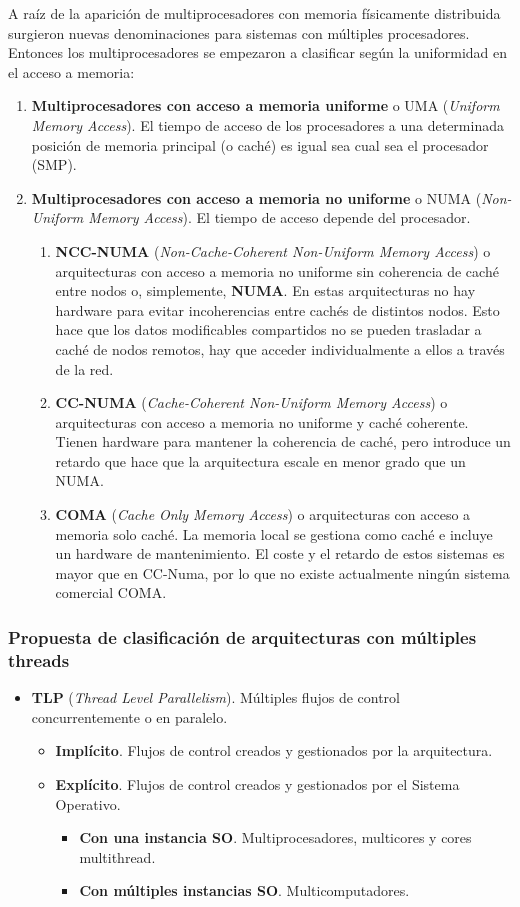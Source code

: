 \documentclass[12pt,spanish]{article}
\begin{document}
A raíz de la aparición de multiprocesadores con memoria físicamente distribuida surgieron nuevas denominaciones para sistemas con múltiples procesadores. Entonces los multiprocesadores se empezaron a clasificar según la uniformidad en el acceso a memoria:
\begin{enumerate}
\item \textbf{Multiprocesadores con acceso a memoria uniforme} o UMA (\textit{Uniform Memory Access}). El tiempo de acceso de los procesadores a una determinada posición de memoria principal (o caché) es igual sea cual sea el procesador (SMP).
\item \textbf{Multiprocesadores con acceso a memoria no uniforme} o NUMA (\textit{Non-Uniform Memory Access}). El tiempo de acceso depende del procesador.
\begin{enumerate}
\item \textbf{NCC-NUMA} (\textit{Non-Cache-Coherent Non-Uniform Memory Access}) o arquitecturas con acceso a memoria no uniforme sin coherencia de caché entre nodos o, simplemente, \textbf{NUMA}. En estas arquitecturas no hay hardware para evitar incoherencias entre cachés de distintos nodos. Esto hace que los datos modificables compartidos no se pueden trasladar a caché de nodos remotos, hay que acceder individualmente a ellos a través de la red.
\item \textbf{CC-NUMA} (\textit{Cache-Coherent Non-Uniform Memory Access}) o arquitecturas con acceso a memoria no uniforme y caché coherente. Tienen hardware para mantener la coherencia de caché, pero introduce un retardo que hace que la arquitectura escale en menor grado que un NUMA.
\item \textbf{COMA} (\textit{Cache Only Memory Access}) o arquitecturas con acceso a memoria solo caché. La memoria local se gestiona como caché e incluye un hardware de mantenimiento. El coste y el retardo de estos sistemas es mayor que en CC-Numa, por lo que no existe actualmente ningún sistema comercial COMA.
\end{enumerate}
\end{enumerate}
\subsubsection{Propuesta de clasificación de arquitecturas con múltiples threads}
\begin{itemize}
\item \textbf{TLP} (\textit{Thread Level Parallelism}). Múltiples flujos de control concurrentemente o en paralelo.
\begin{itemize}
\item \textbf{Implícito}. Flujos de control creados y gestionados por la arquitectura.
\item \textbf{Explícito}. Flujos de control creados y gestionados por el Sistema Operativo.
\begin{itemize}
\item \textbf{Con una instancia SO}. Multiprocesadores, multicores y cores multithread.
\item \textbf{Con múltiples instancias SO}. Multicomputadores.
\end{itemize}
\end{itemize}
\end{itemize}
\end{document}
